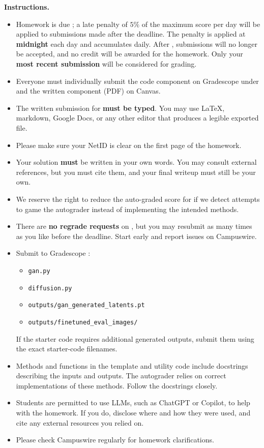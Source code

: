 \textbf{Instructions.}
\begin{itemize}
\item
   Homework is due \textbf{\duedate};
   a late penalty of $5\%$ of the maximum score per day will be applied to submissions made after the deadline. The penalty is applied at \textbf{midnight} each day and accumulates daily. After \lastduedate, submissions will no longer be accepted, and no credit will be awarded for the homework. Only your \textbf{most recent submission} will be considered for grading.

\item
  Everyone must individually submit the code component on Gradescope under \hwc{} and the written component (PDF) on Canvas.

\item
  The written submission for \hw{} \textbf{must be typed}. You may use \LaTeX, markdown, Google Docs, or any other editor that produces a legible exported file.

\item
  Please make sure your NetID is clear on the first page of the homework.

\item
  Your solution \textbf{must} be written in your own words. You may consult external references, but you must cite them, and your final writeup must still be your own.

\item
  We reserve the right to reduce the auto-graded score for \hwc{} if we detect attempts to game the autograder instead of implementing the intended methods.

\item
  There are \textbf{no regrade requests} on \hwc{}, but you may resubmit as many times as you like before the deadline. Start early and report issues on Campuswire.

\item
  Submit to Gradescope \texttt{\hwc{}}:
  \begin{itemize}
  \item \texttt{gan.py}
  \item \texttt{diffusion.py}
  \item \texttt{outputs/gan\_generated\_latents.pt}
  \item \texttt{outputs/finetuned\_eval\_images/}
  \end{itemize}
  If the starter code requires additional generated outputs, submit them using the exact starter-code filenames.

\item
  Methods and functions in the template and utility code include docstrings describing the inputs and outputs. The autograder relies on correct implementations of these methods. Follow the docstrings closely.

\item
  Students are permitted to use LLMs, such as ChatGPT or Copilot, to help with the homework. If you do, disclose where and how they were used, and cite any external resources you relied on.

\item
  Please check Campuswire regularly for homework clarifications.
\end{itemize}
